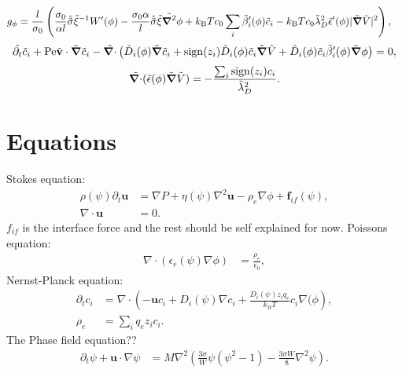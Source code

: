 \documentclass[a4paper,10pt]{article}
\renewcommand{\v}[1]{\mathbf{#1}}
\renewcommand{\v}[1]{\ensuremath{\mathbf{#1}}} %
\newcommand{\ti}[1]{\ensuremath{\tilde{#1}}} %
\newcommand{\gv}[1]{\ensuremath{\mbox{\boldmath$ #1 $}}}
\newcommand{\grad}[1]{\gv{\nabla} #1} %
\renewcommand{\div}[1]{\gv{\nabla} \cdot #1} %
\newcommand{\laplacian}[1]{\grad^2 #1}
\newcommand{\pdt}[1]{\partial_t #1}
\begin{document}
\begin{align}
g_\phi &= \frac{l}{\sigma_0}\left(\frac{\sigma_0}{\alpha l  }\hat{\ti{\sigma}}\ti{\xi}^{-1}W'(\phi) - \frac{\sigma_0 \alpha}{ l}\hat{\ti{\sigma}}\ti{\xi}\ti{\laplacian{}}\phi + k_{\mathrm{B}}T c_0\sum_i \ti{\beta}_i'(\phi) \ti{c}_i - k_{\mathrm{B}}T c_0  \ti{\lambda}_D^2\ti{\epsilon}'(\phi) | \ti{\grad{}} \ti{V} |^2\right) ,
\end{align}
\begin{gather}
\ti{\pdt{}} \ti{c}_i + \mathrm{Pe}\ti{\v{v}} \cdot \ti{\grad{}} \ti{c}_i - \ti{\div{}} \left( \ti{D}_{i} (\phi) \ti{\grad{}} \ti{c}_i + \mathrm{sign}(z_i)\ti{D}_i(\phi)\ti{c}_i \ti{\grad{}} \ti{V} +\ti{D}_i(\phi)\ti{c}_i\ti{\beta}_i'(\phi) \ti{\grad{}} \phi \right) = 0,
\end{gather}
\begin{gather}
\ti{\div{}} ( \ti{\epsilon} (\phi) \ti{\grad{}} \ti{V} ) = - \frac{\sum_i \mathrm{sign}(z_i) c_i}{\ti{\lambda}_D^2}.
\end{gather}
\newpage
\section{Equations}
Stokes equation:
\begin{align}
\rho(\psi) \partial_t \v{u}  &=  \nabla P +\eta(\psi) \nabla^2 \mathbf{u} -  \rho_e  \nabla \phi + \mathbf{f}_{if}(\psi),  \\  
\nabla \cdot\mathbf{u} &= 0.
\end{align}
$f_{if}$ is the interface force and the rest should be self explained for now. \newline
Poissons equation: 
\begin{align}
\nabla\cdot\left(\epsilon_r(\psi)\nabla\phi\right) &= \frac{\rho_e}{\epsilon_0 },
\end{align}
Nernst-Planck equation:
\begin{align}
\partial_t c_i  &=  \nabla  \cdot  \left( - \mathbf{u} c_i  + D_i(\psi) \nabla c_i  +   \frac{D_i(\psi) z_i q_e}{k_B T} c_i \nabla( \phi \right), \\
\rho_e &= \sum_i q_e z_i c_i. 
\end{align}
The Phase field equation?? 
\begin{align}
\partial_t \psi + \mathbf{u}\cdot\nabla\psi &= M\nabla^2\left(\frac{3 \sigma }{W} \psi \left(\psi^2 -1\right) - \frac{3 \sigma W}{8}\nabla^2 \psi\right).
\end{align}
\end{document}
